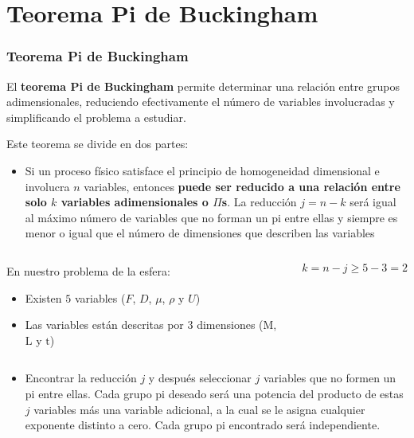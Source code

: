 \documentclass[t]{beamer}
\begin{document}
\section{Teorema Pi de Buckingham}
\begin{frame}
\frametitle{Teorema Pi de Buckingham}

El \textbf{teorema Pi de Buckingham} permite determinar una relación entre grupos adimensionales, reduciendo efectivamente el número de variables involucradas y simplificando el problema a estudiar.
\vspace{0.2cm}

Este teorema se divide en dos partes:

\begin{itemize}

\item Si un proceso físico satisface el principio de homogeneidad dimensional e involucra $n$ variables, entonces \textbf{puede ser reducido a una relación entre solo $k$ variables adimensionales o $\Pi$s}. La reducción $j=n-k$ será igual al máximo número de variables que no forman un pi entre ellas y siempre es menor o igual que el número de dimensiones que describen las variables
\end{itemize}

\begin{columns}
\begin{footnotesize}
\vspace{-0.4cm}

En nuestro problema de la esfera:

\begin{itemize}
\item Existen $5$ variables ($F$, $D$, $\mu$, $\rho$ y $U$)
\item Las variables están descritas por $3$ dimensiones ($\mathrm{M}$, $\mathrm{L}$ y $\mathrm{t}$)
\end{itemize}  

\end{footnotesize}
$$k = n-j\geq 5-3 = 2$$
\end{columns}

\end{frame}


\begin{frame}
\begin{itemize}
\item Encontrar la reducción $j$ y después seleccionar $j$ variables que no formen un pi entre ellas. Cada grupo pi deseado será una potencia del producto de estas $j$ variables más una variable adicional, a la cual se le asigna cualquier exponente distinto a cero. Cada grupo pi encontrado será independiente.
\end{itemize}
\end{frame}
\end{document}
